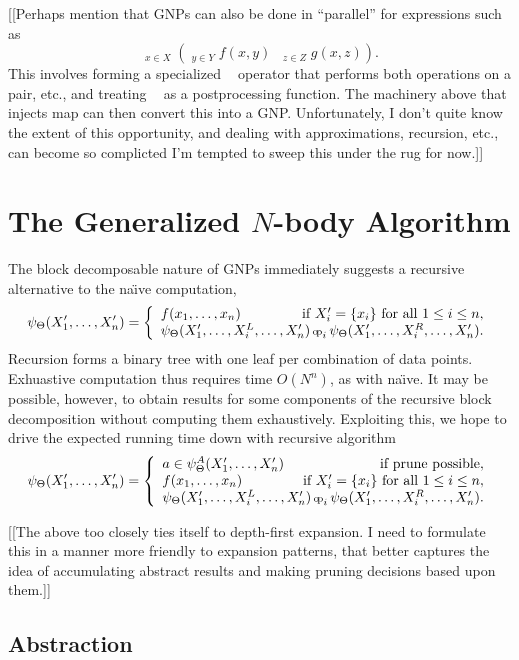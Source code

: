 \documentclass{article}
\newcommand{\OpSym}{\mathrm{O\!p}}
\newcommand{\opsym}{{\scriptstyle \mathrm{o\!p}}}
\newcommand{\OpCurry}[3][]{\mathop{\OpSym^{#1}_{#2}{#3}}}
\newcommand{\opcurry}[3][]{\mathop{\opsym^{#1}_{#2}{#3}}}
\newcommand{\Op}[2][]{\OpCurry[#1]{#2}{}}
\newcommand{\op}[2][]{\opcurry[#1]{#2}{}}
\newcommand{\GNP}{\psi_{\Theta}}
\begin{document}
[[Perhaps mention that GNPs can also be done in ``parallel'' for
expressions such as
\[
\Op{a}_{x \in X} \left( \Op{b}_{y \in Y} f(x,y) \op{d} \Op{c}_{z \in Z} g(x,z) \right) .
\]
This involves forming a specialized $\op{b,c}$ operator that performs
both operations on a pair, etc., and treating $\op{d}$ as a
postprocessing function.  The machinery above that injects map can
then convert this into a GNP.  Unfortunately, I don't quite know the
extent of this opportunity, and dealing with approximations,
recursion, etc., can become so complicted I'm tempted to sweep this
under the rug for now.]]

\section{The Generalized $N$-body Algorithm}

The block decomposable nature of GNPs immediately suggests a recursive
alternative to the na\"{\i}ve computation,
\[
\GNP(X'_1,\ldots,X'_n) = \left\{ \begin{array}{lr}
  f(x_1,\ldots,x_n) & \mbox{if } X'_i = \{x_i\} \mbox{ for all } 1 \leq i \leq n, \\
  \multicolumn{2}{l}{\GNP(X'_1,\ldots,X^L_i,\ldots,X'_n) \op{i} \GNP(X'_1,\ldots,X^R_i,\ldots,X'_n).}
\end{array} \right.
\]
Recursion forms a binary tree with one leaf per combination of data
points.  Exhuastive computation thus requires time $O(N^n)$, as with
na\"{\i}ve.  It may be possible, however, to obtain results for some
components of the recursive block decomposition without computing them
exhaustively.  Exploiting this, we hope to drive the expected running
time down with recursive algorithm
\[
\GNP(X'_1,\ldots,X'_n) = \left\{ \begin{array}{lr}
  a \in \GNP^A(X'_1,\ldots,X'_n) & \mbox{if prune possible}, \\
  f(x_1,\ldots,x_n) & \mbox{if } X'_i = \{x_i\} \mbox{ for all } 1 \leq i \leq n, \\
  \multicolumn{2}{l}{\GNP(X'_1,\ldots,X^L_i,\ldots,X'_n) \op{i} \GNP(X'_1,\ldots,X^R_i,\ldots,X'_n).}
\end{array} \right.
\]

[[The above too closely ties itself to depth-first expansion.  I need
to formulate this in a manner more friendly to expansion patterns,
that better captures the idea of accumulating abstract results and
making pruning decisions based upon them.]]

\subsection{Abstraction}
\end{document}
